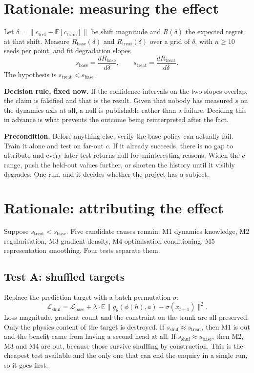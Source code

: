 \documentclass[9pt]{extarticle}
\begin{document}
\section{Rationale: measuring the effect}

Let $\delta = \|c_{\text{test}} - \mathbb{E}[c_{\text{train}}]\|$ be shift magnitude and $R(\delta)$ the expected regret at that shift. Measure $R_{\text{base}}(\delta)$ and $R_{\text{treat}}(\delta)$ over a grid of $\delta$, with $n \geq 10$ seeds per point, and fit degradation slopes
\[
s_{\text{base}} = \frac{dR_{\text{base}}}{d\delta}, \qquad s_{\text{treat}} = \frac{dR_{\text{treat}}}{d\delta}.
\]
The hypothesis is $s_{\text{treat}} < s_{\text{base}}$.

\textbf{Decision rule, fixed now.} If the confidence intervals on the two slopes overlap, the claim is falsified and that is the result. Given that nobody has measured $s$ on the dynamics axis at all, a null is publishable rather than a failure. Deciding this in advance is what prevents the outcome being reinterpreted after the fact.

\textbf{Precondition.} Before anything else, verify the base policy can actually fail. Train it alone and test on far-out $c$. If it already succeeds, there is no gap to attribute and every later test returns null for uninteresting reasons. Widen the $c$ range, push the held-out values further, or shorten the history until it visibly degrades. One run, and it decides whether the project has a subject.

\section{Rationale: attributing the effect}

Suppose $s_{\text{treat}} < s_{\text{base}}$. Five candidate causes remain: M1 dynamics knowledge, M2 regularisation, M3 gradient density, M4 optimisation conditioning, M5 representation smoothing. Four tests separate them.

\subsection{Test A: shuffled targets}

Replace the prediction target with a batch permutation $\sigma$:
\[
\mathcal{L}_{\text{shuf}} = \mathcal{L}_{\text{base}} + \lambda \cdot \mathbb{E}\big\| g_\theta(\phi(h), a) - \sigma(x_{t+1}) \big\|^2 .
\]
Loss magnitude, gradient count and the constraint on the trunk are all preserved. Only the physics content of the target is destroyed. If $s_{\text{shuf}} \approx s_{\text{treat}}$, then M1 is out and the benefit came from having a second head at all. If $s_{\text{shuf}} \approx s_{\text{base}}$, then M2, M3 and M4 are out, because those survive shuffling by construction. This is the cheapest test available and the only one that can end the enquiry in a single run, so it goes first.
\end{document}
